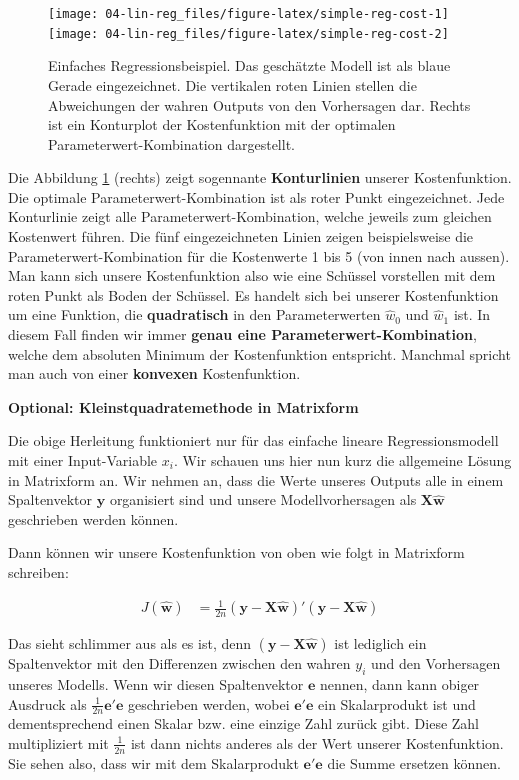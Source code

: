 \documentclass[
]{book}
\begin{document}
\begin{figure}

{\centering \texttt{[image: 04-lin-reg\_files/figure-latex/simple-reg-cost-1]} \texttt{[image: 04-lin-reg\_files/figure-latex/simple-reg-cost-2]} 

}

\caption{Einfaches Regressionsbeispiel. Das geschätzte Modell ist als blaue Gerade eingezeichnet. Die vertikalen roten Linien stellen die Abweichungen der wahren Outputs von den Vorhersagen dar. Rechts ist ein Konturplot der Kostenfunktion mit der optimalen Parameterwert-Kombination dargestellt.}\label{fig:simple-reg-cost}
\end{figure}

Die Abbildung \ref{fig:simple-reg-cost} (rechts) zeigt sogennante \textbf{Konturlinien} unserer Kostenfunktion. Die optimale Parameterwert-Kombination ist als roter Punkt eingezeichnet. Jede Konturlinie zeigt alle Parameterwert-Kombination, welche jeweils zum gleichen Kostenwert führen. Die fünf eingezeichneten Linien zeigen beispielsweise die Parameterwert-Kombination für die Kostenwerte 1 bis 5 (von innen nach aussen). Man kann sich unsere Kostenfunktion also wie eine Schüssel vorstellen mit dem roten Punkt als Boden der Schüssel. Es handelt sich bei unserer Kostenfunktion um eine Funktion, die \textbf{quadratisch} in den Parameterwerten \(\hat{w}_0\) und \(\hat{w}_1\) ist. In diesem Fall finden wir immer \textbf{genau eine Parameterwert-Kombination}, welche dem absoluten Minimum der Kostenfunktion entspricht. Manchmal spricht man auch von einer \textbf{konvexen} Kostenfunktion.

\textbf{Optional: Kleinstquadratemethode in Matrixform}

Die obige Herleitung funktioniert nur für das einfache lineare Regressionsmodell mit einer Input-Variable \(x_i\). Wir schauen uns hier nun kurz die allgemeine Lösung in Matrixform an. Wir nehmen an, dass die Werte unseres Outputs alle in einem Spaltenvektor \(\mathbf{y}\) organisiert sind und unsere Modellvorhersagen als \(\mathbf{X}\mathbf{\hat{w}}\) geschrieben werden können.

Dann können wir unsere Kostenfunktion von oben wie folgt in Matrixform schreiben:

\begin{align}
J(\mathbf{\hat{w}}) &= \frac{1}{2n} (\mathbf{y} - \mathbf{X}\mathbf{\hat{w}})' (\mathbf{y} - \mathbf{X}\mathbf{\hat{w}})
\end{align}

Das sieht schlimmer aus als es ist, denn \((\mathbf{y} - \mathbf{X}\mathbf{\hat{w}})\) ist lediglich ein Spaltenvektor mit den Differenzen zwischen den wahren \(y_i\) und den Vorhersagen unseres Modells. Wenn wir diesen Spaltenvektor \(\mathbf{e}\) nennen, dann kann obiger Ausdruck als \(\frac{1}{2n} \mathbf{e}'\mathbf{e}\) geschrieben werden, wobei \(\mathbf{e}'\mathbf{e}\) ein Skalarprodukt ist und dementsprechend einen Skalar bzw. eine einzige Zahl zurück gibt. Diese Zahl multipliziert mit \(\frac{1}{2n}\) ist dann nichts anderes als der Wert unserer Kostenfunktion. Sie sehen also, dass wir mit dem Skalarprodukt \(\mathbf{e}'\mathbf{e}\) die Summe ersetzen können.
\end{document}

